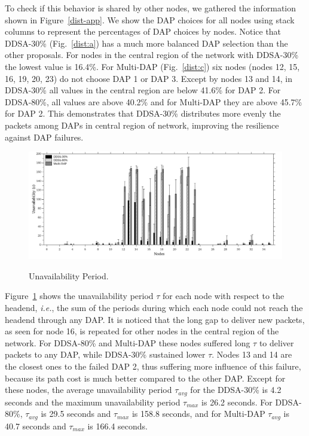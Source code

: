 \documentclass[conference]{IEEEtran}
\begin{document}
To check if this behavior is shared by other nodes, we gathered the information shown in Figure~\ref{dist-app}. We show the DAP choices for all nodes using stack columns to represent the percentages of DAP choices by nodes. Notice that DDSA-30\% (Fig.~\ref{dist:a}) has a much more balanced DAP selection than the other proposals. For nodes in the central region of the network with DDSA-30\% the lowest value is 16.4\%. For Multi-DAP (Fig.~\ref{dist:c}) six nodes (nodes 12, 15, 16, 19, 20, 23) ​​do not choose  DAP 1 or DAP 3. Except by nodes 13 and 14, in DDSA-30\% all values in the central region are below 41.6\% for DAP 2. For DDSA-80\%, all values are above 40.2\% and for Multi-DAP they are above 45.7\% for DAP 2. This demonstrates that DDSA-30\% distributes more evenly the packets among DAPs  in central region of network, improving the resilience against DAP failures.



\begin{figure}[htb]
  \centering
  \label{intv-dap}{\includegraphics[scale=.175]{IEEE-consolidados/G-wo-rcv-pkt.jpg}} 
  \caption{Unavailability Period.}
  \label{sum-intv}
\end{figure}

Figure~\ref{sum-intv} shows the unavailability period $\tau$ for each node with respect to the headend,\textit{ i.e.}, the sum of the periods during which each node could not reach the headend through any DAP. 
 It is noticed that the long gap to deliver new packets, as seen for node 16, is repeated for other nodes in the central region of the network. For DDSA-80\% and Multi-DAP these nodes suffered long $\tau$ to deliver packets to any DAP, while DDSA-30\% sustained lower $\tau$. 
Nodes 13 and 14 are the closest ones to the failed DAP 2, thus suffering more influence of this failure, because its path cost is much better compared to the other DAP. Except for these nodes, the average unavailability period $\tau_{avg}$ for the DDSA-30\% is 4.2 seconds and the maximum unavailability period $\tau_{max}$ is 26.2 seconds. For DDSA-80\%, $\tau_{avg}$ is 29.5 seconds and $\tau_{max}$ is 158.8 seconds, and for Multi-DAP $\tau_{avg}$ is 40.7 seconds and $\tau_{max}$ is 166.4 seconds. 
\end{document}
